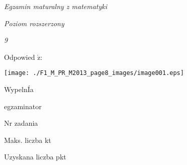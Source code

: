 \documentclass[a4paper,12pt]{article}
\begin{document}
{\it Egzamin maturalny z matematyki}

{\it Poziom rozszerzony}

{\it 9}

Odpowied $\acute{\mathrm{z}}$:
\begin{center}
\texttt{[image: ./F1\_M\_PR\_M2013\_page8\_images/image001.eps]}
\end{center}
WypelnÍa

egzaminator

Nr zadania

Maks. liczba kt

Uzyskana liczba pkt
\end{document}
